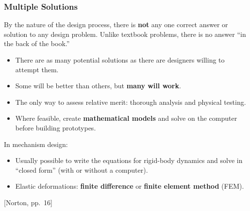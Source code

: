 \documentclass[10pt,aspectratio=43]{beamer}
\newcommand{\pref}[1]{\vfill\hfill{\scriptsize\color{gray}[Norton, pp.~#1]}}
\begin{document}
\begin{frame}
\frametitle{Multiple Solutions}

\begin{redbox}
By the nature of the design process, there is \textbf{not} any one correct answer or solution to any design problem. Unlike textbook problems, there is no answer ``in the back of the book.''
\end{redbox}

\vspace{6pt}
\begin{itemize}
  \item There are as many potential solutions as there are designers willing to attempt them.
  \item Some will be better than others, but \textbf{many will work}.
  \item The only way to assess relative merit: thorough analysis and physical testing.
  \item Where feasible, create \textbf{mathematical models} and solve on the computer before building prototypes.
\end{itemize}

\vspace{6pt}
In mechanism design:
\begin{itemize}
  \item Usually possible to write the equations for rigid-body dynamics and solve in ``closed form'' (with or without a computer).
  \item Elastic deformations: \textbf{finite difference} or \textbf{finite element method} (FEM).
\end{itemize}
\pref{16}
\end{frame}

\end{document}
